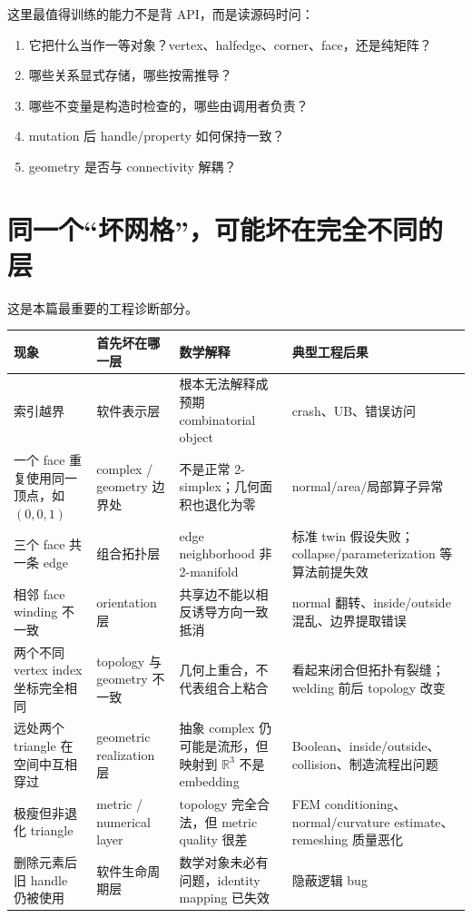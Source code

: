 \documentclass[UTF8,11pt]{ctexart}
\begin{document}
这里最值得训练的能力不是背 API，而是读源码时问：

\begin{enumerate}
  \item 它把什么当作一等对象？vertex、halfedge、corner、face，还是纯矩阵？
  \item 哪些关系显式存储，哪些按需推导？
  \item 哪些不变量是构造时检查的，哪些由调用者负责？
  \item mutation 后 handle/property 如何保持一致？
  \item geometry 是否与 connectivity 解耦？
\end{enumerate}

\section{同一个“坏网格”，可能坏在完全不同的层}

这是本篇最重要的工程诊断部分。

\begin{center}
\small
\begin{longtable}{p{3.0cm}p{3.4cm}p{4.2cm}p{4.2cm}}
\toprule
现象 & 首先坏在哪一层 & 数学解释 & 典型工程后果\\
\midrule
索引越界 & 软件表示层 & 根本无法解释成预期 combinatorial object & crash、UB、错误访问\\
\addlinespace
一个 face 重复使用同一顶点，如 $(0,0,1)$ & complex / geometry 边界处 & 不是正常 2-simplex；几何面积也退化为零 & normal/area/局部算子异常\\
\addlinespace
三个 face 共一条 edge & 组合拓扑层 & edge neighborhood 非 2-manifold & 标准 twin 假设失败；collapse/parameterization 等算法前提失效\\
\addlinespace
相邻 face winding 不一致 & orientation 层 & 共享边不能以相反诱导方向一致抵消 & normal 翻转、inside/outside 混乱、边界提取错误\\
\addlinespace
两个不同 vertex index 坐标完全相同 & topology 与 geometry 不一致 & 几何上重合，不代表组合上粘合 & 看起来闭合但拓扑有裂缝；welding 前后 topology 改变\\
\addlinespace
远处两个 triangle 在空间中互相穿过 & geometric realization 层 & 抽象 complex 仍可能是流形，但映射到 $\mathbb R^3$ 不是 embedding & Boolean、inside/outside、collision、制造流程出问题\\
\addlinespace
极瘦但非退化 triangle & metric / numerical layer & topology 完全合法，但 metric quality 很差 & FEM conditioning、normal/curvature estimate、remeshing 质量恶化\\
\addlinespace
删除元素后旧 handle 仍被使用 & 软件生命周期层 & 数学对象未必有问题，identity mapping 已失效 & 隐蔽逻辑 bug\\
\bottomrule
\end{longtable}
\end{center}
\end{document}
